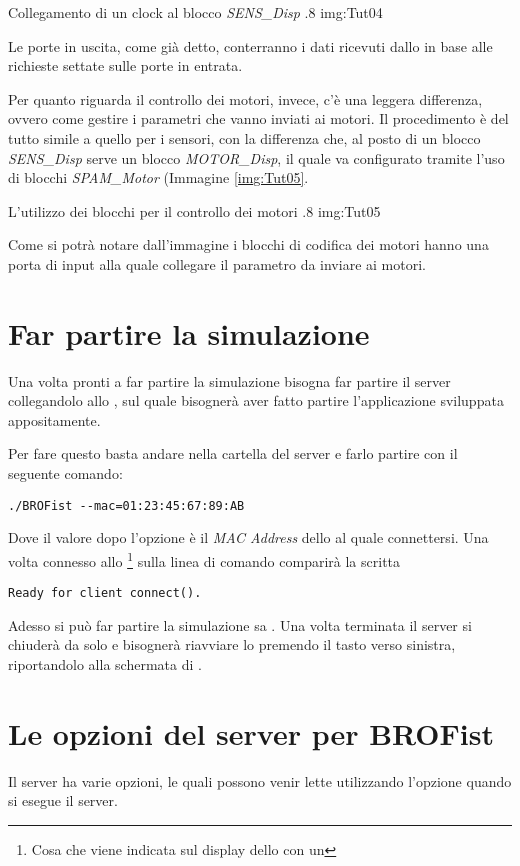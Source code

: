         {Collegamento di un clock al blocco \emph{SENS\_Disp}}
        {.8}
        {img:Tut04}

Le porte in uscita, come già detto, conterranno i dati ricevuti dallo
\SPAM{} in base alle richieste settate sulle porte in entrata.

Per quanto riguarda il controllo dei motori, invece, c'è una leggera
differenza, ovvero come gestire i parametri che vanno inviati ai motori. Il
procedimento è del tutto simile a quello per i sensori, con la differenza
che, al posto di un blocco \emph{SENS\_Disp} serve un blocco
\emph{MOTOR\_Disp}, il quale va configurato tramite l'uso di blocchi
\emph{SPAM\_Motor} (Immagine \ref{img:Tut05}.

        {L'utilizzo dei blocchi per il controllo dei motori}
        {.8}
        {img:Tut05}

Come si potrà notare dall'immagine i blocchi di codifica dei motori hanno
una porta di input alla quale collegare il parametro da inviare ai motori.

\section{Far partire la simulazione}
Una volta pronti a far partire la simulazione bisogna far partire il server
collegandolo allo \SPAM{}, sul quale bisognerà aver fatto partire
l'applicazione sviluppata appositamente.

Per fare questo basta andare nella cartella del server e farlo partire con
il seguente comando:
\begin{verbatim}
./BROFist --mac=01:23:45:67:89:AB
\end{verbatim}
Dove il valore dopo l'opzione  è il \emph{MAC Address}
dello \SPAM{} al quale connettersi. Una volta connesso allo
\SPAM{}\footnote{Cosa che viene indicata sul display dello \SPAM{} con un
\cypher{[BT]}} sulla linea di comando comparirà la scritta
\begin{verbatim}
Ready for client connect().
\end{verbatim}
Adesso si può far partire la simulazione sa \SciCos{}. Una volta terminata
il server si chiuderà da solo e bisognerà riavviare lo \SPAM{} premendo il
tasto verso sinistra, riportandolo alla schermata di \nxtOSEK{}.

\section{Le opzioni del server per BROFist}
Il server ha varie opzioni, le quali possono venir lette utilizzando
l'opzione  quando si esegue il server.

